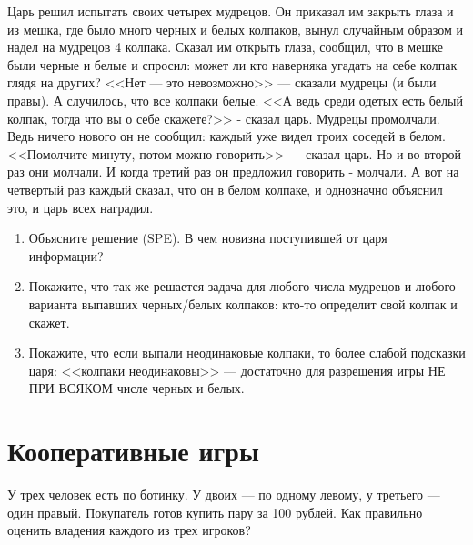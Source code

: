 \begin{problem} [Колпаки]
\begin{source} \cite{myerson:gtac} \end{source}
 Царь решил испытать своих
четырех мудрецов. Он приказал им закрыть глаза и из мешка,
где было много черных и белых колпаков, вынул случайным
образом и надел на мудрецов 4 колпака. Сказал им открыть
глаза, сообщил, что в мешке были черные и белые и спросил:
может ли кто наверняка угадать на себе колпак глядя на
других? <<Нет --- это невозможно>> --- сказали мудрецы (и были
правы). А случилось, что все колпаки белые. <<А ведь среди
одетых есть белый колпак, тогда что вы о себе скажете?>> -
сказал царь. Мудрецы промолчали. Ведь ничего нового он не
сообщил: каждый уже видел троих соседей в белом. <<Помолчите
минуту, потом можно говорить>> --- сказал царь. Но и во второй
раз они молчали. И когда третий раз он предложил говорить -
молчали. А вот на четвертый раз каждый сказал, что он в
белом колпаке, и однозначно объяснил это, и царь всех
наградил. 

\begin{enumerate} 

\item Объясните решение (SPE). В чем новизна
поступившей от царя информации? 

\item Покажите, что так же
решается задача для любого числа мудрецов и любого варианта
выпавших черных/белых колпаков: кто-то определит свой
колпак и скажет. 

\item Покажите, что если выпали неодинаковые
колпаки, то более слабой подсказки царя: <<колпаки
неодинаковы>> --- достаточно для разрешения игры НЕ ПРИ ВСЯКОМ
числе черных и белых.
\end{enumerate}



\begin{sol}

\end{sol}
\end{problem}






\section{Кооперативные игры}

\begin{problem}[Ботинки]
У трех человек есть по ботинку. У двоих --- по одному левому, у третьего --- один правый. Покупатель готов купить пару за 100 рублей. Как правильно оценить владения каждого из трех игроков?




\begin{sol}

\end{sol}
\end{problem}



